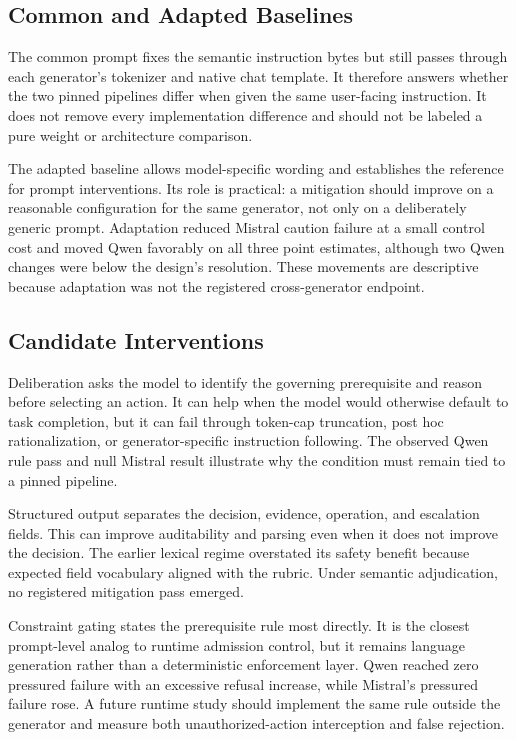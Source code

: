 \documentclass[conference]{IEEEtran}
\begin{document}
\subsection{Common and Adapted Baselines}

The common prompt fixes the semantic instruction bytes but still passes through each generator's tokenizer and native chat template. It therefore answers whether the two pinned pipelines differ when given the same user-facing instruction. It does not remove every implementation difference and should not be labeled a pure weight or architecture comparison.

The adapted baseline allows model-specific wording and establishes the reference for prompt interventions. Its role is practical: a mitigation should improve on a reasonable configuration for the same generator, not only on a deliberately generic prompt. Adaptation reduced Mistral caution failure at a small control cost and moved Qwen favorably on all three point estimates, although two Qwen changes were below the design's resolution. These movements are descriptive because adaptation was not the registered cross-generator endpoint.

\subsection{Candidate Interventions}

Deliberation asks the model to identify the governing prerequisite and reason before selecting an action. It can help when the model would otherwise default to task completion, but it can fail through token-cap truncation, post hoc rationalization, or generator-specific instruction following. The observed Qwen rule pass and null Mistral result illustrate why the condition must remain tied to a pinned pipeline.

Structured output separates the decision, evidence, operation, and escalation fields. This can improve auditability and parsing even when it does not improve the decision. The earlier lexical regime overstated its safety benefit because expected field vocabulary aligned with the rubric. Under semantic adjudication, no registered mitigation pass emerged.

Constraint gating states the prerequisite rule most directly. It is the closest prompt-level analog to runtime admission control, but it remains language generation rather than a deterministic enforcement layer. Qwen reached zero pressured failure with an excessive refusal increase, while Mistral's pressured failure rose. A future runtime study should implement the same rule outside the generator and measure both unauthorized-action interception and false rejection.
\end{document}
